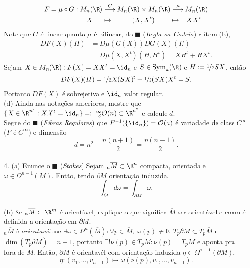\textcolor{gris}{
\begin{align*}
 F = \mu \circ G: M_n(\R)  &\overset{G}{\longrightarrow} M_n(\R) \times M_n(\R) \overset{\mu}{\longrightarrow} M_n(\R) \\ 
 X\hspace{0.5cm} &\mapsto \hspace{1cm}(X,X^t) \hspace{0.8cm}\mapsto \hspace{0.3cm}XX^t 
\end{align*}
Note que \(G\) é linear quanto \(\mu\) é bilinear, do \(\blacksquare\) (\emph{Regla da Cadeia}) e ítem (b), 
\begin{align*} DF(X)(H) &= D\mu(G(X))DG(X)(H) \\ 
    &= D\mu(X,X^t)(H,H^t) = XH^t + HX^t.\end{align*}
Sejam \(X \in M_n(\R) : F(X) = XX^t = \id_n\) e \(S \in \operatorname{Sym}_n(\R)\) e \(H:= \nicefrac{1}{2}SX\), então  
\[DF(X)(H) = \nicefrac{1}{2}X(SX)^t + \nicefrac{1}{2}(SX)X^t = S. \]
Portanto \(DF(X)\) é sobrejetiva e \(\id_n\) valor regular. 
}  \vspace{0.3cm}\\
(d) Ainda nas notações anteriores, mostre que \(\{X \in \R^{n^2}: XX^t = \id_n\}=:\ ^\infty_{\ d}\mathcal{O}(n)\subset \R^{n^2}\) e calcule \(d\). \\ 
\textcolor{gris}{Segue do \(\blacksquare\) (\emph{Fibras Regulares}) que \(F^{-1}(\{\id_n\}) = \mathcal{O}(n) \) é variadade de clase \(C^\infty\) (\(F\) é \(C^\infty\)) e dimensão 
\[ d = n^2 - \frac{n(n+1)}{2} = \frac{n(n-1)}{2}.\] }\\ 
4. (a) Enunce o \(\blacksquare\) (\emph{Stokes}) \textcolor{gris}{Sejam \(_n\overline{M}\subset \R^n\) compacta, orientada e \(\omega \in \Omega^{n-1}(M)\). Então, tendo \(\partial M\) orientação induzida, 
\[\int_{\overline{M}} d\omega = \int_{\partial M} \omega.\]} \\
(b) Se \(_n\overline{M}\subset \R^m\) é orientável, explique o que significa \(\overline{M}\) ser orientável e como é definida a orientação em \(\partial M\). \\ 
\textcolor{gris}{\(_n\overline{M}\) é \emph{orientavél} sse \(\exists \omega \in \Omega^n(\overline{M}): \forall p \in \overline{M}, \ \omega(p) \neq 0\). \(T_p\partial M \subset T_p\overline{M}\) e \(\dim(T_p \partial M)=n-1\), portanto \(\exists ! \nu(p) \in T_p\overline{M}: \nu(p) \perp T_p\overline{M}\) e aponta pra fora de \(\overline{M}\). Então, \(\partial M\) é orientavél com orientação induzida \(\eta \in \Omega^{n-1}(\partial M)\), 
\[\eta : (v_1, \ldots, v_{n-1}) \mapsto \omega(\nu(p), v_1, \ldots, v_{n-1}).\]}

